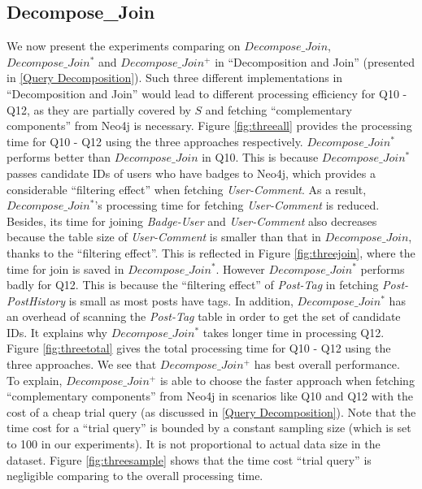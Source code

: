\subsection{Decompose\_Join}
\label{exp:DecomposeJoin}
We now present the experiments comparing on $Decompose\_Join$, $Decompose\_Join^{*}$ and $Decompose\_Join^{+}$ in ``Decomposition and Join'' (presented in \ref{Query Decomposition}). Such three different implementations in ``Decomposition and Join'' would lead to different processing efficiency for Q10 - Q12, as they are partially covered by $S$ and fetching ``complementary components'' from Neo4j is necessary. Figure \ref{fig:threeall} provides the processing time for Q10 - Q12 using the three approaches respectively. $Decompose\_Join^{*}$ performs  better than $Decompose\_Join$ in Q10. This is because $Decompose\_Join^{*}$ passes candidate IDs of users who have badges to Neo4j, which provides a considerable ``filtering effect'' when fetching \textit{User-Comment}. As a result, $Decompose\_Join^{*}$'s processing time for fetching \textit{User-Comment} is reduced. Besides, its time for joining \textit{Badge-User} and \textit{User-Comment} also decreases because the table size of \textit{User-Comment} is smaller than that in $Decompose\_Join$, thanks to the ``filtering effect''. This is reflected in Figure \ref{fig:threejoin}, where the time for join is saved in $Decompose\_Join^{*}$. However $Decompose\_Join^{*}$ performs badly for Q12. This is because the ``filtering effect'' of \textit{Post-Tag} in fetching \textit{Post-PostHistory} is small as most posts have tags. In addition, $Decompose\_Join^{*}$ has an overhead of scanning the \textit{Post-Tag} table in order to get the set of candidate IDs. It explains why $Decompose\_Join^{*}$ takes longer time in processing Q12. Figure \ref{fig:threetotal} gives the total processing time for Q10 - Q12 using the three approaches. We see that $Decompose\_Join^{+}$ has best overall performance. To explain,  $Decompose\_Join^{+}$ is able to choose the faster approach when fetching ``complementary components'' from Neo4j in scenarios like Q10 and Q12 with  the cost of a cheap trial query (as discussed in \ref{Query Decomposition}). Note that the time cost for a ``trial query'' is bounded by a constant sampling size (which is set to 100 in our experiments). It is not proportional to actual data size in the dataset. Figure \ref{fig:threesample} shows that the time cost ``trial query'' is negligible comparing to the overall processing time.


